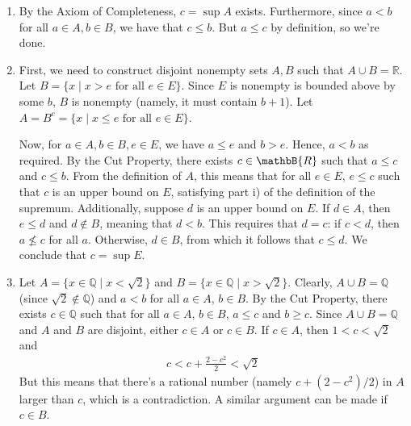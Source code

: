 \documentclass[a4paper]{report}
\newenvironment{ex}[1]
    {\noindent{\large \bf Exercise #1.}}{\vspace{0.5cm}}
\begin{document}
\begin{ex}{1.3.10}
\begin{enumerate}[label=\alph*)]
\item By the Axiom of Completeness, $c = \sup A$ exists. Furthermore, since $a <
  b$ for all $a \in A, b \in B$, we have that $c \leq b$. But
  $a \leq c$ by definition, so we're done.
\item First, we need to construct disjoint nonempty sets $A, B$ such that $A
  \cup B = \mathbb{R}$. Let $B = \{ x \mid x > e \text{ for all } e \in E\}$.
  Since $E$ is nonempty is bounded above by some $b$, $B$ is nonempty (namely,
  it must contain $b + 1$). Let $A = B^c = {\{ x \mid x \leq e \text{ for all } e
  \in E \}}$. 


  Now, for $a \in A, b \in B, e \in E$, we have $a \leq e$ and $b > e$. Hence,
  $a < b$ as required. By the Cut Property, there exists $c \in \mathbB{R}$ such
  that $a \leq c$ and $c \leq b$. From the definition of $A$, this means that
  for all $e \in E$, $e \leq c$ such that $c$ is an upper bound on $E$, 
  satisfying part i) of the definition of the supremum. Additionally, suppose
  $d$ is an upper bound on $E$. If $d \in A$, then $e \leq d$ and $d
  \notin B$, meaning that $d < b$. This requires that $d = c$: if $c < d$, then
  $a \not\leq c$ for all $a$. Otherwise, $d \in B$, from which it follows that
  $c \leq d.$ We conclude that $c = \sup E$.

\item Let $A = \{ x \in \mathbb{Q} \mid x < \sqrt{2} \}$ and $B = \{x \in
  \mathbb{Q} \mid x > \sqrt{2}\}$. Clearly, $A \cup B = \mathbb{Q}$ (since
  $\sqrt{2} \notin \mathbb{Q}$) and $a < b$
  for all $a \in A$, $b \in B$. By the Cut Property, there exists $c \in
  \mathbb{Q}$ such that for all $a \in A$, $b \in B$, $a \leq c$ and $b \geq c$.
  Since $A \cup B = \mathbb{Q}$ and $A$ and $B$ are disjoint, either $c \in A$
  or $c \in B$. If $c \in A$, then $1 < c < \sqrt{2}$ and
\begin{align*}
c < c + \frac{2 - c^2}{2}  < \sqrt{2} 
\end{align*}
But this means that there's a rational number (namely $c + (2 - c^2)/2$) in $A$ larger
than $c$, which is a contradiction. A similar argument can be made if $c \in B$.
\end{enumerate}
\end{ex}
\end{document}
